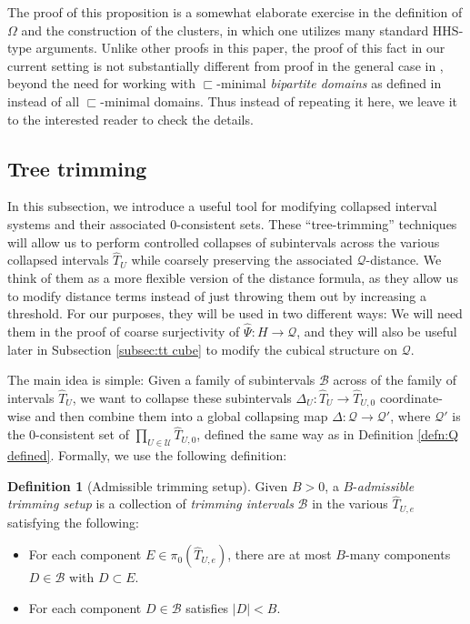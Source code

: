 \documentclass{amsart}
\theoremstyle{definition}
\newtheorem{definition}[theorem]{Definition}
\theoremstyle{remark}
\theoremstyle{definition}
\newcommand{\calB}{\mathcal{B}}
\newcommand{\calQ}{\mathcal{Q}}
\newcommand{\calU}{\mathcal{U}}
\newcommand{\hT}{\widehat{T}}
\newcommand{\hPsi}{\widehat{\Psi}}
\newcommand{\nest}{\sqsubset}
\begin{document}
The proof of this proposition is a somewhat elaborate exercise in the definition of $\Omega$ and the construction of the clusters, in which one utilizes many standard HHS-type arguments.  Unlike other proofs in this paper, the proof of this fact in our current setting is not substantially different from proof in the general case in \cite[Subsection 9.5]{Dur_infcube}, beyond the need for working with $\nest$-minimal \emph{bipartite domains} as defined in \cite[Definition 9.2]{Dur_infcube} instead of all $\nest$-minimal domains.  Thus instead of repeating it here, we leave it to the interested reader to check the details.

\subsection{Tree trimming}\label{subsec:tree trimming}

In this subsection, we introduce a useful tool for modifying collapsed interval systems and their associated $0$-consistent sets.  These ``tree-trimming'' techniques will allow us to perform controlled collapses of subintervals across the various collapsed intervals $\hT_U$ while coarsely preserving the associated $\calQ$-distance.  We think of them as a more flexible version of the distance formula, as they allow us to modify distance terms instead of just throwing them out by increasing a threshold.  For our purposes, they will be used in two different ways: We will need them in the proof of coarse surjectivity of $\hPsi:H \to \calQ$, and they will also be useful later in Subsection \ref{subsec:tt cube} to modify the cubical structure on $\calQ$.

The main idea is simple: Given a family of subintervals $\calB$ across of the family of intervals $\hT_U$, we want to collapse these subintervals $\Delta_U:\hT_U \to \hT_{U,0}$ coordinate-wise and then combine them into a global collapsing map $\Delta:\calQ \to \calQ'$, where $\calQ'$ is the $0$-consistent set of $\prod_{U \in \calU} \hT_{U,0}$, defined the same way as in Definition \ref{defn:Q defined}.  Formally, we use the following definition:

\begin{definition}[Admissible trimming setup]\label{defn:trimming setup}
Given $B>0$, a $B$-\emph{admissible trimming setup} is a collection of \emph{trimming intervals} $\calB$ in the various $\hT_{U,e}$ satisfying the following:
\begin{itemize}
\item For each component  $E \in \pi_0(\hT_{U,e})$, there are at most $B$-many components $D \in \calB$ with $D \subset E$.
\item For each component $D \in \calB$ satisfies $|D|<B$.
\end{itemize}
\end{definition}
\end{document}
